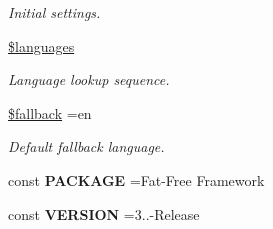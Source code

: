 \begin{DoxyCompactItemize}
\begin{DoxyCompactList}\small\item\em Initial settings. \end{DoxyCompactList}\item 
\hypertarget{class_base_a8856d0a49881ef8e0a6d205d37d4a7af}{}\label{class_base_a8856d0a49881ef8e0a6d205d37d4a7af} 
\hyperlink{class_base_a8856d0a49881ef8e0a6d205d37d4a7af}{\$languages}
\begin{DoxyCompactList}\small\item\em Language lookup sequence. \end{DoxyCompactList}\item 
\hypertarget{class_base_a0aa2d1acd291d3fedc1a3617d716e28e}{}\label{class_base_a0aa2d1acd291d3fedc1a3617d716e28e} 
\hyperlink{class_base_a0aa2d1acd291d3fedc1a3617d716e28e}{\$fallback} =\textquotesingle{}en\textquotesingle{}
\begin{DoxyCompactList}\small\item\em Default fallback language. \end{DoxyCompactList}\end{DoxyCompactItemize}
{\bf }\par
\begin{DoxyCompactItemize}
\item 
\hypertarget{class_base_a037d2e8a6e9d6f5c55e8b24e3faa5189}{}\label{class_base_a037d2e8a6e9d6f5c55e8b24e3faa5189} 
const {\bfseries P\+A\+C\+K\+A\+GE} =\textquotesingle{}Fat-\/Free Framework\textquotesingle{}
\item 
\hypertarget{class_base_af71005841ce53adac00581ab0ba24c1f}{}\label{class_base_af71005841ce53adac00581ab0ba24c1f} 
const {\bfseries V\+E\+R\+S\+I\+ON} =\textquotesingle{}3..-\/Release\textquotesingle{}
\end{DoxyCompactItemize}

